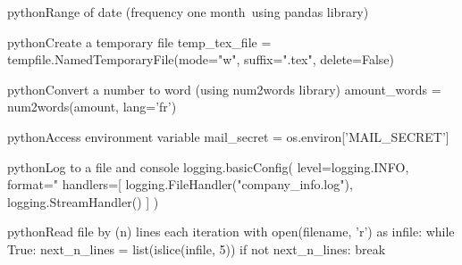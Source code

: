 \documentclass[10pt,a4paper]{article}
\begin{document}
\begin{multicols}{3}
\begin{codebox}{python}{Range of date (frequency one month\, using pandas library)}
\end{codebox}

\begin{codebox}{python}{Create a temporary file}
temp_tex_file = tempfile.NamedTemporaryFile(mode="w", suffix=".tex", delete=False)

\end{codebox}

\begin{codebox}{python}{Convert a number to word (using num2words library)}
amount_words = num2words(amount, lang='fr')

\end{codebox}

\begin{codebox}{python}{Access environment variable}
mail_secret = os.environ['MAIL_SECRET']

\end{codebox}

\begin{codebox}{python}{Log to a file and console}
logging.basicConfig(
    level=logging.INFO,
    format="%
    handlers=[
        logging.FileHandler("company_info.log"),
        logging.StreamHandler()
    ]
)

\end{codebox}

\begin{codebox}{python}{Read file by (n) lines each iteration}
  with open(filename, 'r') as infile:
    while True:
      next_n_lines = list(islice(infile, 5))
      if not next_n_lines:
          break

\end{codebox}


\AtNextBibliography{\footnotesize}
\printbibliography  
\end{multicols}
\end{document}
